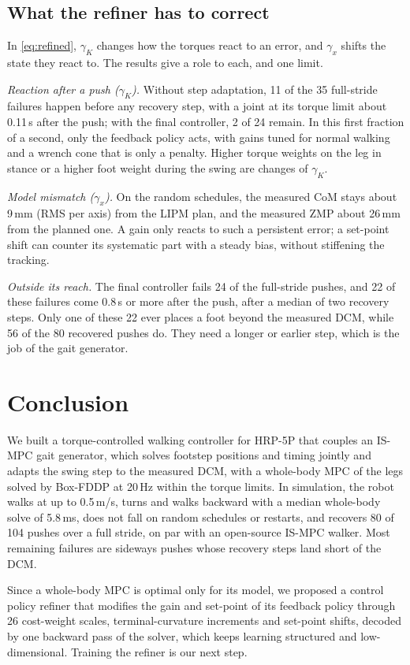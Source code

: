 \documentclass[conference]{IEEEtran}
\begin{document}
\subsection{What the refiner has to correct}
In \eqref{eq:refined}, $\gamma_K$ changes how the torques react to an error, and $\gamma_x$ shifts the state they react to.
The results give a role to each, and one limit.

\emph{Reaction after a push ($\gamma_K$).} Without step adaptation, 11 of the 35 full-stride failures happen before any recovery step, with a joint at its torque limit about 0.11\,s after the push; with the final controller, 2 of 24 remain.
In this first fraction of a second, only the feedback policy acts, with gains tuned for normal walking and a wrench cone that is only a penalty.
Higher torque weights on the leg in stance or a higher foot weight during the swing are changes of $\gamma_K$.

\emph{Model mismatch ($\gamma_x$).} On the random schedules, the measured CoM stays about 9\,mm (RMS per axis) from the LIPM plan, and the measured ZMP about 26\,mm from the planned one.
A gain only reacts to such a persistent error; a set-point shift can counter its systematic part with a steady bias, without stiffening the tracking.

\emph{Outside its reach.} The final controller fails 24 of the full-stride pushes, and 22 of these failures come 0.8\,s or more after the push, after a median of two recovery steps.
Only one of these 22 ever places a foot beyond the measured DCM, while 56 of the 80 recovered pushes do.
They need a longer or earlier step, which is the job of the gait generator.

\section{Conclusion}
We built a torque-controlled walking controller for HRP-5P that couples an IS-MPC gait generator, which solves footstep positions and timing jointly and adapts the swing step to the measured DCM, with a whole-body MPC of the legs solved by Box-FDDP at 20\,Hz within the torque limits.
In simulation, the robot walks at up to 0.5\,m/s, turns and walks backward with a median whole-body solve of 5.8\,ms, does not fall on random schedules or restarts, and recovers 80 of 104 pushes over a full stride, on par with an open-source IS-MPC walker.
Most remaining failures are sideways pushes whose recovery steps land short of the DCM.

Since a whole-body MPC is optimal only for its model, we proposed a control policy refiner that modifies the gain and set-point of its feedback policy through 26 cost-weight scales, terminal-curvature increments and set-point shifts, decoded by one backward pass of the solver, which keeps learning structured and low-dimensional.
Training the refiner is our next step.

\begingroup
\raggedright
\renewcommand{\footnotesize}{\fontsize{7.5}{8.6}\selectfont}


\endgroup
\end{document}
